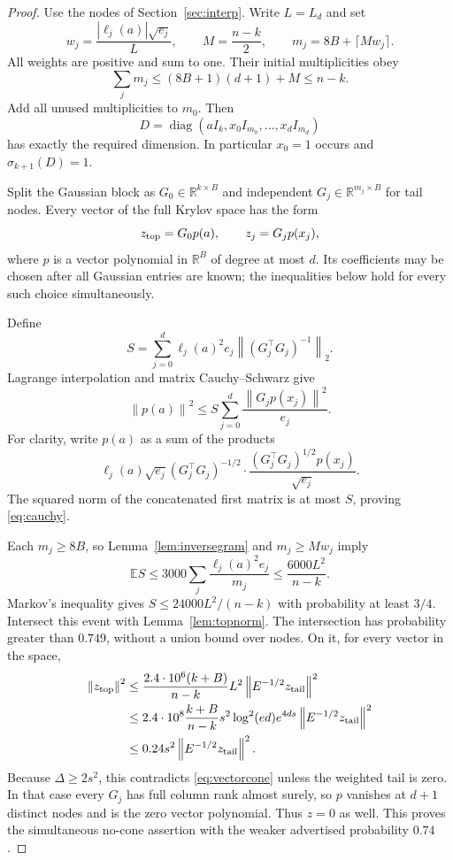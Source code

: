 \documentclass[11pt]{article}
\theoremstyle{definition}
\newcommand{\R}{\mathbb R}
\newcommand{\E}{\mathbb E}
\newcommand{\diag}{\operatorname{diag}}
\newcommand{\norm}[1]{\left\lVert#1\right\rVert}
\begin{document}
\begin{proof}
Use the nodes of Section~\ref{sec:interp}. Write $L=L_d$ and set
\begin{equation}\label{eq:multiplicity}
w_j=\frac{|\ell_j(a)|\sqrt{e_j}}{L},\qquad
M=\frac{n-k}{2},\qquad m_j=8B+\lceil Mw_j\rceil.
\end{equation}
All weights are positive and sum to one. Their initial multiplicities obey
\[
\sum_jm_j\le(8B+1)(d+1)+M\le n-k.
\]
Add all unused multiplicities to $m_0$. Then
\[
D=\diag(aI_k,x_0I_{m_0},\ldots,x_dI_{m_d})
\]
has exactly the required dimension. In particular $x_0=1$ occurs and $\sigma_{k+1}(D)=1$.

Split the Gaussian block as $G_0\in\R^{k\times B}$ and independent $G_j\in\R^{m_j\times B}$ for tail nodes. Every vector of the full Krylov space has the form
\[
z_{\rm top}=G_0p(a),\qquad z_j=G_jp(x_j),
\]
where $p$ is a vector polynomial in $\R^B$ of degree at most $d$. Its coefficients may be chosen after all Gaussian entries are known; the inequalities below hold for every such choice simultaneously.

Define
\begin{equation}\label{eq:S}
S=\sum_{j=0}^d\ell_j(a)^2e_j\norm{(G_j^\top G_j)^{-1}}_2.
\end{equation}
Lagrange interpolation and matrix Cauchy--Schwarz give
\begin{equation}\label{eq:cauchy}
\norm{p(a)}^2\le S\sum_{j=0}^d\frac{\norm{G_jp(x_j)}^2}{e_j}.
\end{equation}
For clarity, write $p(a)$ as a sum of the products
\[
\ell_j(a)\sqrt{e_j}(G_j^\top G_j)^{-1/2}
\cdot\frac{(G_j^\top G_j)^{1/2}p(x_j)}{\sqrt{e_j}}.
\]
The squared norm of the concatenated first matrix is at most $S$, proving \eqref{eq:cauchy}.

Each $m_j\ge8B$, so Lemma~\ref{lem:inversegram} and $m_j\ge Mw_j$ imply
\begin{equation}\label{eq:ES}
\E S\le3000\sum_j\frac{\ell_j(a)^2e_j}{m_j}
\le\frac{6000L^2}{n-k}.
\end{equation}
Markov's inequality gives $S\le24000L^2/(n-k)$ with probability at least $3/4$. Intersect this event with Lemma~\ref{lem:topnorm}. The intersection has probability greater than $0.749$, without a union bound over nodes. On it, for every vector in the space,
\begin{align}
\norm{z_{\rm top}}^2
&\le\frac{2.4\cdot10^6(k+B)}{n-k}L^2\norm{E^{-1/2}z_{\rm tail}}^2\notag\\
&\le2.4\cdot10^8\frac{k+B}{n-k}s^2\log^2(ed)e^{4ds}
\norm{E^{-1/2}z_{\rm tail}}^2\notag\\
&\le0.24s^2\norm{E^{-1/2}z_{\rm tail}}^2.\label{eq:pathwise}
\end{align}
Because $\Delta\ge2s^2$, this contradicts \eqref{eq:vectorcone} unless the weighted tail is zero. In that case every $G_j$ has full column rank almost surely, so $p$ vanishes at $d+1$ distinct nodes and is the zero vector polynomial. Thus $z=0$ as well. This proves the simultaneous no-cone assertion with the weaker advertised probability $0.74$.
\end{proof}
\end{document}
